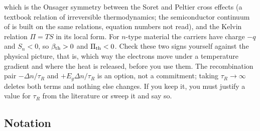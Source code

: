 \documentclass[11pt]{article}
\begin{document}
which is the Onsager symmetry between the Soret and Peltier cross effects (a textbook relation of irreversible thermodynamics; the semiconductor continuum of \cite{Qu2023} is built on the same relations, equation numbers not read), and the Kelvin relation
$\Pi=TS$ in its local form. For $n$-type material the carriers have charge $-q$ and $S_n<0$, so
$\beta_{\rm th}>0$ and $\Pi_{\rm th}<0$. Check these two signs yourself against the physical picture, that is, which way the electrons move under a temperature gradient and where the heat is released, before you use them. The recombination pair $-\Delta n/\tau_R$ and
$+E_g\Delta n/\tau_R$ is an option, not a commitment; taking $\tau_R\to\infty$ deletes both terms and
nothing else changes. If you keep it, you must justify a value for $\tau_R$ from the literature or sweep it
and say so.

\subsection{Notation}
\end{document}
